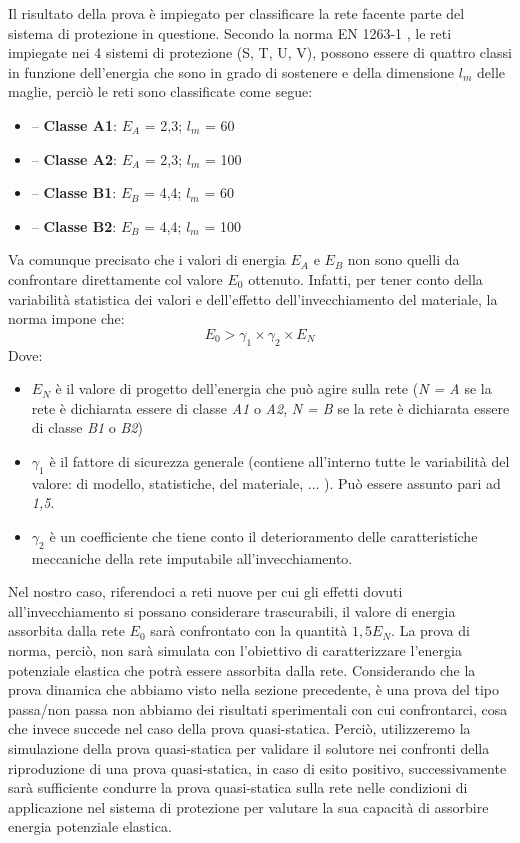 Il risultato della prova è impiegato per classificare la rete facente parte del sistema di protezione in questione. Secondo la norma EN 1263-1 \cite{EN1263-1}, le reti impiegate nei 4 sistemi di protezione (S, T, U, V), possono essere di quattro classi in funzione dell'energia che sono in grado di sostenere e della dimensione $l_m$ delle maglie, perciò le reti sono classificate come segue: 
\begin{itemize}
  \item -- \textbf{Classe A1}: $E_A$ = 2,3; $l_m$ = 60
  \item -- \textbf{Classe A2}: $E_A$ = 2,3; $l_m$ = 100
  \item -- \textbf{Classe B1}: $E_B$ = 4,4; $l_m$ = 60
  \item -- \textbf{Classe B2}: $E_B$ = 4,4; $l_m$ = 100
\end{itemize}
Va comunque precisato che i valori di energia $E_A$ e $E_B$ non sono quelli da confrontare direttamente col valore $E_0$ ottenuto. Infatti, per tener conto della variabilità statistica dei valori e dell'effetto dell'invecchiamento del materiale, la norma impone che:
\begin{equation}
  E_0 >  \gamma_1 \times \gamma_2 \times E_N
\end{equation} 
Dove: 
\begin{itemize}
  \item $E_N$ è il valore di progetto dell'energia che può agire sulla rete (\textit{N = A} se la rete è dichiarata essere di classe \textit{A1} o \textit{A2}, \textit{N = B} se la rete è dichiarata essere di classe \textit{B1} o \textit{B2})
  \item $\gamma_1$ è il fattore di sicurezza generale (contiene all'interno tutte le variabilità del valore: di modello, statistiche, del materiale, ... ). Può essere assunto pari ad \textit{1,5}.
  \item $\gamma_2$ è un coefficiente che tiene conto il deterioramento delle caratteristiche meccaniche della rete imputabile all'invecchiamento.
\end{itemize}
Nel nostro caso, riferendoci a reti nuove per cui gli effetti dovuti all'invecchiamento si possano considerare trascurabili, il valore di energia assorbita dalla rete $E_0$ sarà confrontato con la quantità $1,5E_N$.
La prova di norma, perciò, non sarà simulata con l'obiettivo di caratterizzare l'energia potenziale elastica che potrà essere assorbita dalla rete. Considerando che la prova dinamica che abbiamo visto nella sezione precedente, è una prova del tipo passa/non passa non abbiamo dei risultati sperimentali con cui confrontarci, cosa che invece succede nel caso della prova quasi-statica. Perciò, utilizzeremo la simulazione della prova quasi-statica per validare il solutore nei confronti della riproduzione di una prova quasi-statica, in caso di esito positivo, successivamente sarà sufficiente condurre la prova quasi-statica sulla rete nelle condizioni di applicazione nel sistema di protezione per valutare la sua capacità di assorbire energia potenziale elastica. 

